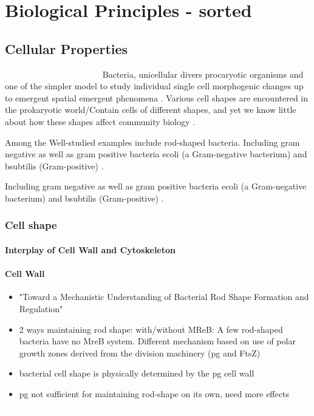 \documentclass{article}
\newcommand{\todo}[1]{\colorbox{WildStrawberry}{\textcolor{white}{#1}}}
\begin{document}
\section{Biological Principles - sorted}
\subsection{Cellular Properties}

\todo{move this to introduction}
Bacteria, unicellular divers procaryotic organisms and one of the simpler model to study individual single cell morphogenic changes up to emergent spatial emergent phenomena \cite{Vollmer001}.
Various cell shapes are encountered in the prokaryotic world/Contain cells of different shapes, and yet we know little about how these shapes affect community biology \cite{Smith2017}.

Among the Well-studied examples include rod-shaped bacteria. Including gram negative as well as gram positive bacteria \ac{ecoli} (a Gram-negative bacterium) and \ac{bsubtilis} (Gram-positive) \cite{Chang2014}.

Including gram negative as well as gram positive bacteria \ac{ecoli} (a Gram-negative bacterium) and \ac{bsubtilis} (Gram-positive) \cite{Chang2014}.

\subsubsection{Cell shape}

\paragraph{Interplay of Cell Wall and Cytoskeleton}
\paragraph{Cell Wall}
\begin{itemize}
    \item \cite{Garner2021} "Toward a Mechanistic Understanding of Bacterial Rod Shape Formation and Regulation" \todo{why are we citing this?}
    \item \cite{Daniel2003} 2 ways maintaining rod shape: with/without MReB: A few rod-shaped bacteria have no MreB system.
        Different mechanism based on use of polar growth zones derived from the division machinery (\ac{pg} and FtsZ)
    \item \cite{Amir2014} bacterial cell shape is physically determined by the \ac{pg} cell wall
    \item \ac{pg} not sufficient for maintaining rod-shape on its own, need more effects \todo{do we need more details from this paper?} \todo{@Toqi find citation}
\end{itemize}
\end{document}
